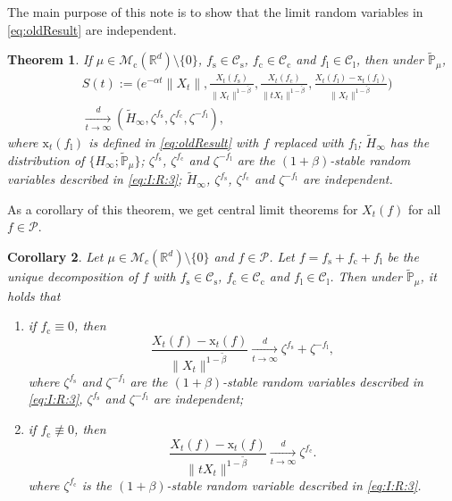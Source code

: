 \documentclass[12pt,a4paper]{amsart}
\theoremstyle{plain}
\newtheorem{thm}{Theorem}[section]
\newtheorem{cor}[thm]{Corollary}
\theoremstyle{definition}
\numberwithin{equation}{section}
\begin{document}
	The main purpose of this note is to show that the limit  random variables in \eqref{eq:oldResult} are independent.

\begin{thm}
\label{thm:M}
	If $\mu\in \mathcal M_\mathrm c(\mathbb R^d)\setminus \{0\}$, $f_\mathrm s\in \mathcal C_\mathrm s$, $f_\mathrm c \in \mathcal C_\mathrm c$ and $f_\mathrm l \in \mathcal C_\mathrm l$, then under $\mathbb {\widetilde P}_\mu$,
\begin{align} \label{eq:M.1}
	&S(t):=
	\Bigg(e^{-\alpha t}\|X_t\|, \frac{X_t(f_\mathrm s)}{\|X_t\|^{1-\tilde \beta}},\frac{X_t(f_\mathrm c)}{\|tX_t\|^{1-\tilde \beta}}, \frac{ X_t(f_\mathrm l) - \mathrm x_t(f_\mathrm l)}{\|X_t\|^{1-\tilde \beta}}
	\Bigg)
	\\&\xrightarrow[t\rightarrow \infty]{d}(\widetilde H_\infty,\zeta^{f_\mathrm s},\zeta^{f_\mathrm c},\zeta^{-f_\mathrm l}),
\end{align}
	where $\mathrm x_t(f_\mathrm l)$ is defined in 
	\eqref{eq:oldResult} 
	with $f$ replaced with $f_\mathrm l$;
	$\widetilde H_\infty$ has the distribution of $\{H_{\infty}; \widetilde {\mathbb P}_\mu\}$;
	$\zeta^{f_\mathrm s}$, $\zeta^{f_\mathrm c}$ and $\zeta^{-f_\mathrm l}$ are the $(1+\beta)$-stable random variables described in \eqref{eq:I:R:3};
	$\widetilde H_\infty$,  $\zeta^{f_\mathrm s}$, $\zeta^{f_\mathrm c}$ and $\zeta^{-f_\mathrm l}$ are independent.
\end{thm}

	As a corollary of this theorem, we get  central limit theorems for $X_t(f)$ for all $f\in \mathcal P$.

\begin{cor}
	Let $\mu\in \mathcal M_c(\mathbb R^d)\setminus \{0\}$ and $f\in \mathcal P$.
	Let  $f=f_\mathrm s + f_\mathrm c + f_\mathrm l$ be the unique decomposition of $f$ with $f_\mathrm s \in \mathcal C_\mathrm s$, $f_\mathrm c \in \mathcal C_\mathrm c$ and $f_\mathrm l \in \mathcal C_\mathrm l$.
	Then under $\widetilde {\mathbb{P}}_{\mu}$, it holds that
\begin{enumerate}
\item
	if $f_\mathrm c\equiv 0$, then
\[
    \frac{ X_t(f) - \mathrm x_t(f)}{\|X_t\|^{1-\tilde \beta}}
    \xrightarrow[t\to \infty]{d} \zeta^{f_\mathrm s}+\zeta^{-f_\mathrm l},
\]
	where $\zeta^{f_\mathrm s}$ and $\zeta^{-f_\mathrm l}$ are the $(1+\beta)$-stable random variables described in \eqref{eq:I:R:3}, $\zeta^{f_\mathrm s}$ and $\zeta^{-f_\mathrm l}$ are independent;
\item
if $f_\mathrm c\not\equiv 0$, then
\[
    \frac{ X_t(f) - \mathrm x_t(f)}{\|tX_t\|^{1-\tilde \beta}}
    \xrightarrow[t\to \infty]{d}\zeta^{f_\mathrm c}.
\]
	where $\zeta^{f_\mathrm c}$ is the $(1+\beta)$-stable random variable described in \eqref{eq:I:R:3}.
\end{enumerate}
\end{cor}
\end{document}

